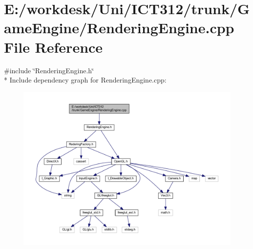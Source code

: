 \section{E\+:/workdesk/\+Uni/\+I\+C\+T312/trunk/\+Game\+Engine/\+Rendering\+Engine.cpp File Reference}
\label{_rendering_engine_8cpp}
{\ttfamily \#include \char`\"{}Rendering\+Engine.\+h\char`\"{}}\\*
Include dependency graph for Rendering\+Engine.\+cpp\+:\nopagebreak
\begin{figure}[H]
\begin{center}
\leavevmode
\includegraphics[width=350pt]{dd/ddb/_rendering_engine_8cpp__incl}
\end{center}
\end{figure}
